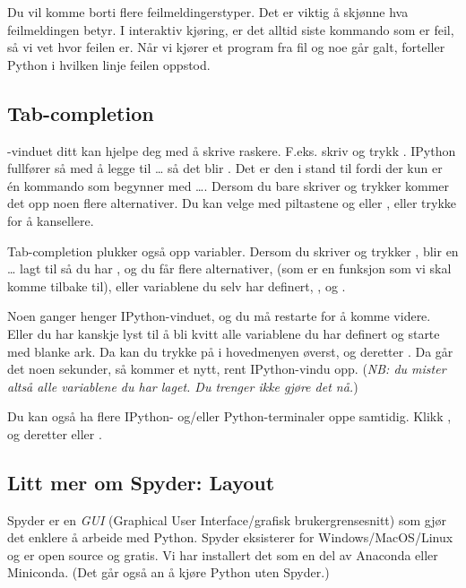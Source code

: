 Du vil komme borti flere feilmeldingerstyper. Det er viktig å skjønne hva feilmeldingen betyr. I interaktiv kjøring, er det alltid siste kommando som er feil, så vi vet hvor feilen er. Når vi kjører et program fra fil og noe går galt, forteller Python i hvilken linje feilen oppstod.

\subsection{Tab-completion}

-vinduet ditt kan hjelpe deg med å skrive raskere. F.eks. skriv  og trykk . IPython fullfører så med å legge til \ldots{} så det blir . Det er den i stand til fordi der kun er én kommando som begynner med \ldots. Dersom du bare skriver  og trykker  kommer det opp noen flere alternativer. Du kan velge med piltastene og  eller , eller trykke  for å kansellere.

Tab-completion plukker også opp variabler. Dersom du skriver  og trykker , blir en \ldots{} lagt til så du har , og du får flere alternativer,  (som er en funksjon som vi skal komme tilbake til), eller variablene du selv har definert, ,  og .

Noen ganger henger IPython-vinduet, og du må restarte for å komme videre. Eller du har kanskje lyst til å bli kvitt alle variablene du har definert og starte med blanke ark.  Da kan du trykke på  i hovedmenyen øverst, og deretter . Da går det noen sekunder, så kommer et nytt, rent IPython-vindu opp. ({\em NB: du mister altså alle variablene du har laget. Du trenger ikke gjøre det nå.})

Du kan også ha flere IPython- og/eller Python-terminaler oppe samtidig. Klikk , og deretter  eller .

\subsection{Litt mer om Spyder: Layout} 
Spyder er en \emph{GUI} (Graphical User Interface/grafisk brukergrensesnitt) som gjør det enklere å arbeide med Python. Spyder eksisterer for Windows/MacOS/Linux og er open source og gratis. Vi har installert det som en del av Anaconda eller Miniconda. (Det går også an å kjøre Python uten Spyder.)


